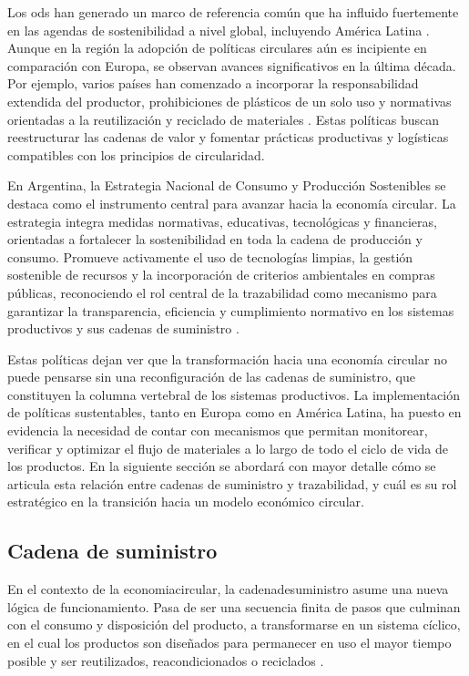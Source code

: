 Los \acrshort{ods} han generado un marco de referencia común que ha influido fuertemente en las agendas de \gls{sostenibilidad} a nivel global, incluyendo América Latina \cite{sostenible2021argentina}. Aunque en la región la adopción de políticas circulares aún es incipiente en comparación con Europa, se observan avances significativos en la última década. Por ejemplo, varios países han comenzado a incorporar la responsabilidad extendida del productor, prohibiciones de plásticos de un solo uso y normativas orientadas a la reutilización y reciclado de materiales \cite{cepal2021economia}. Estas políticas buscan reestructurar las cadenas de valor y fomentar prácticas productivas y logísticas compatibles con los principios de circularidad.

En Argentina, la Estrategia Nacional de Consumo y Producción Sostenibles se destaca como el instrumento central para avanzar hacia la economía circular. La estrategia integra medidas normativas, educativas, tecnológicas y financieras, orientadas a fortalecer la sostenibilidad en toda la cadena de producción y consumo. Promueve activamente el uso de tecnologías limpias, la gestión sostenible de recursos y la incorporación de criterios ambientales en compras públicas, reconociendo el rol central de la trazabilidad como mecanismo para garantizar la transparencia, eficiencia y cumplimiento normativo en los sistemas productivos y sus cadenas de suministro \cite{sostenible2021argentina}.

Estas políticas dejan ver que la transformación hacia una economía circular no puede pensarse sin una reconfiguración de las cadenas de suministro, que constituyen la columna vertebral de los sistemas productivos. La implementación de políticas sustentables, tanto en Europa como en América Latina, ha puesto en evidencia la necesidad de contar con mecanismos que permitan monitorear, verificar y optimizar el flujo de materiales a lo largo de todo el ciclo de vida de los productos. En la siguiente sección se abordará con mayor detalle cómo se articula esta relación entre cadenas de suministro y \gls{trazabilidad}, y cuál es su rol estratégico en la transición hacia un modelo económico circular.

\subsection{Cadena de suministro}
\label{sec:supply-chain}

En el contexto de la \gls{economiacircular}, la \gls{cadenadesuministro} asume una nueva lógica de funcionamiento. Pasa de ser una secuencia finita de pasos que culminan con el consumo y disposición del producto, a transformarse en un sistema cíclico, en el cual los productos son diseñados para permanecer en uso el mayor tiempo posible y ser reutilizados, reacondicionados o reciclados \cite{cerda2016economia}. 

